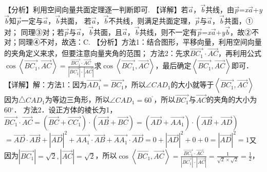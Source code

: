 【分析】利用空间向量共面定理逐一判断即可.
【详解】若\(\overrightarrow{a}\)，\(\overrightarrow{b}\)共线，由\(\overrightarrow{p}\)=\emph{x}\(\overrightarrow{a}\)+\emph{y}\(\overrightarrow{b}\)知\(\overrightarrow{p}\)一定与\(\overrightarrow{a}\)，\(\overrightarrow{b}\)共面， 若\(\overrightarrow{a}\)，\(\overrightarrow{b}\)不共线，则满足共面定理，\(\overrightarrow{p}\)与\(\overrightarrow{a}\)，\(\overrightarrow{b}\)共面，①对； 同理③对；若\(\overrightarrow{p}\)与\(\overrightarrow{a}\)，\(\overrightarrow{b}\)共面，且\(\overrightarrow{a}\)，\(\overrightarrow{b}\)共线，则不一定有\(\overrightarrow{p}\)=\emph{x}\(\overrightarrow{a}\)+\emph{y}\(\overrightarrow{b}\)，故②不对；同理④不对，故选：C.
【分析】方法1：结合图形，平移向量，利用空间向量的夹角定义来求，但要注意向量夹角的范围； 方法2：先求\(\overrightarrow{BC_{1}} \cdot \overrightarrow{AC}\)，再利用公式\(\cos\left\langle \overrightarrow{BC_{1}},\overrightarrow{AC} \right\rangle = \frac{\overrightarrow{BC_{1}} \cdot \overrightarrow{AC}}{\left| \overrightarrow{BC_{1}} \right| \cdot \allowbreak\left| \overrightarrow{AC} \right|}\)求\(\cos\left\langle \overrightarrow{BC_{1}},\overrightarrow{AC} \right\rangle\)，最后确定\(\left\langle \overrightarrow{BC_{1}},\overrightarrow{AC} \right\rangle\)即可．
【详解】解：方法1：因为\(\overrightarrow{AD_{1}} = \overrightarrow{BC_{1}}\)，所以\(\angle CAD_{1}\)的大小就等于\(\left\langle \overrightarrow{BC_{1}},\overrightarrow{AC} \right\rangle\) 因为△\(CAD_{1}\)为等边三角形，所以\(\angle CAD_{1} = 60^{{^\circ}}\)，所以\(\overrightarrow{BC_{1}}\)与\(\overrightarrow{AC}\)的夹角的大小为\(60{^\circ}\)． 方法2．设正方体的棱长为1，\(\overrightarrow{BC_{1}} \cdot \overrightarrow{AC} = \allowbreak\left( \overrightarrow{BC} + \overrightarrow{CC_{1}} \right) \cdot \allowbreak\left( \overrightarrow{AB} + \overrightarrow{BC} \right) = \allowbreak\left( \overrightarrow{AD} + \overrightarrow{AA_{1}} \right) \cdot \allowbreak\left( \overrightarrow{AB} + \overrightarrow{AD} \right)\)\(= \overrightarrow{AD} \cdot \overrightarrow{AB} + \left| \overrightarrow{AD} \right|^{2} + \overrightarrow{AA_{1}} \cdot \overrightarrow{AB} + \overrightarrow{AA_{1}} \cdot \overrightarrow{AD} = 0 + \left| \overrightarrow{AD} \right|^{2} + 0 + 0 = \allowbreak\left| \overrightarrow{AD} \right|^{2} = 1\)又因为\(\left| \overrightarrow{BC_{1}} \right| = \sqrt{2},\left| \overrightarrow{AC} \right| = \sqrt{2}\)，所以\(\cos\left\langle \overrightarrow{BC_{1}},\overrightarrow{AC} \right\rangle = \frac{\overrightarrow{BC_{1}} \cdot \overrightarrow{AC}}{\left| \overrightarrow{BC_{1}} \right| \cdot \allowbreak\left| \overrightarrow{AC} \right|} = \frac{1}{\sqrt{2} \times \sqrt{2}} = \frac{1}{2}\)，
